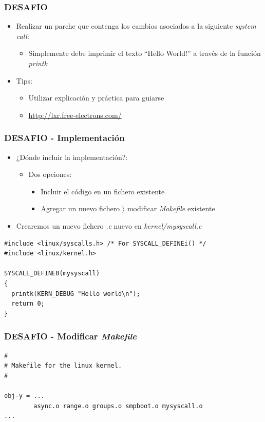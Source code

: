 \begin{frame}
\frametitle{DESAFIO}
   \begin{itemize}  
   \item Realizar un parche que contenga los cambios asociados a la siguiente \textit{system call}: 
   \begin{itemize}
      \item Simplemente debe imprimir el texto ``Hello World!'' a través de la función \textit{printk}
    \end{itemize}
    \item Tips:
    \begin{itemize}
      \item Utilizar explicación y práctica para guiarse
      \item \url{http://lxr.free-electrons.com/}
    \end{itemize}
 \end{itemize}
\end{frame}

\begin{frame}[fragile]
\frametitle{DESAFIO - Implementación}
  \begin{itemize}
    \item ¿Dónde incluir la implementación?:
    \begin{itemize}
      \item Dos opciones:
      \begin{itemize}
        \item Incluir el código en un fichero existente
        \item Agregar un nuevo fichero $\rangle$ modificar \emph{Makefile} existente
      \end{itemize}
    \end{itemize}
    \item Crearemos un nuevo fichero \emph{.c} nuevo en \emph{kernel/mysyscall.c}
  \end{itemize}
  \begin{lstlisting}
#include <linux/syscalls.h> /* For SYSCALL_DEFINEi() */
#include <linux/kernel.h>

SYSCALL_DEFINE0(mysyscall)
{
  printk(KERN_DEBUG "Hello world\n");
  return 0;
}      
  \end{lstlisting}
\end{frame}

\begin{frame}[fragile]
\frametitle{DESAFIO - Modificar \emph{Makefile}}
  \begin{lstlisting}
#
# Makefile for the linux kernel.
#

obj-y = ...
        async.o range.o groups.o smpboot.o mysyscall.o
...
  \end{lstlisting}  
\end{frame}

